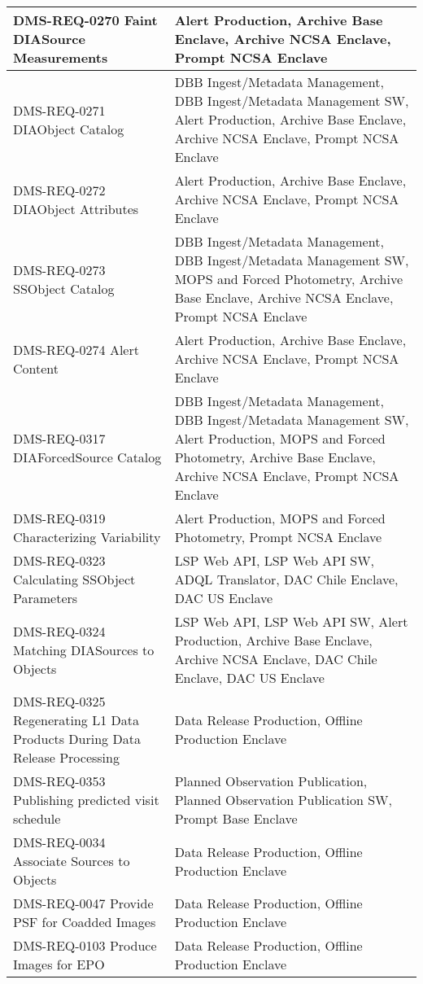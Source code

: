 \begin{xtabular}{p{0.4\textwidth}p{0.55\textwidth}}
DMS-REQ-0270 Faint DIASource Measurements & Alert Production, Archive Base Enclave, Archive NCSA Enclave, Prompt NCSA Enclave \\ \hline
DMS-REQ-0271 DIAObject Catalog & DBB Ingest/Metadata Management, DBB Ingest/Metadata Management SW, Alert Production, Archive Base Enclave, Archive NCSA Enclave, Prompt NCSA Enclave \\ \hline
DMS-REQ-0272 DIAObject Attributes & Alert Production, Archive Base Enclave, Archive NCSA Enclave, Prompt NCSA Enclave \\ \hline
DMS-REQ-0273 SSObject Catalog & DBB Ingest/Metadata Management, DBB Ingest/Metadata Management SW, MOPS and Forced Photometry, Archive Base Enclave, Archive NCSA Enclave, Prompt NCSA Enclave \\ \hline
DMS-REQ-0274 Alert Content & Alert Production, Archive Base Enclave, Archive NCSA Enclave, Prompt NCSA Enclave \\ \hline
DMS-REQ-0317 DIAForcedSource Catalog & DBB Ingest/Metadata Management, DBB Ingest/Metadata Management SW, Alert Production, MOPS and Forced Photometry, Archive Base Enclave, Archive NCSA Enclave, Prompt NCSA Enclave \\ \hline
DMS-REQ-0319 Characterizing Variability & Alert Production, MOPS and Forced Photometry, Prompt NCSA Enclave \\ \hline
DMS-REQ-0323 Calculating SSObject Parameters & LSP Web API, LSP Web API SW, ADQL Translator, DAC Chile Enclave, DAC US Enclave \\ \hline
DMS-REQ-0324 Matching DIASources to Objects & LSP Web API, LSP Web API SW, Alert Production, Archive Base Enclave, Archive NCSA Enclave, DAC Chile Enclave, DAC US Enclave \\ \hline
DMS-REQ-0325 Regenerating L1 Data Products During Data Release Processing & Data Release Production, Offline Production Enclave \\ \hline
DMS-REQ-0353 Publishing predicted visit schedule & Planned Observation Publication, Planned Observation Publication SW, Prompt Base Enclave \\ \hline
DMS-REQ-0034 Associate Sources to Objects & Data Release Production, Offline Production Enclave \\ \hline
DMS-REQ-0047 Provide PSF for Coadded Images & Data Release Production, Offline Production Enclave \\ \hline
DMS-REQ-0103 Produce Images for EPO & Data Release Production, Offline Production Enclave \\ \hline

\end{xtabular}
